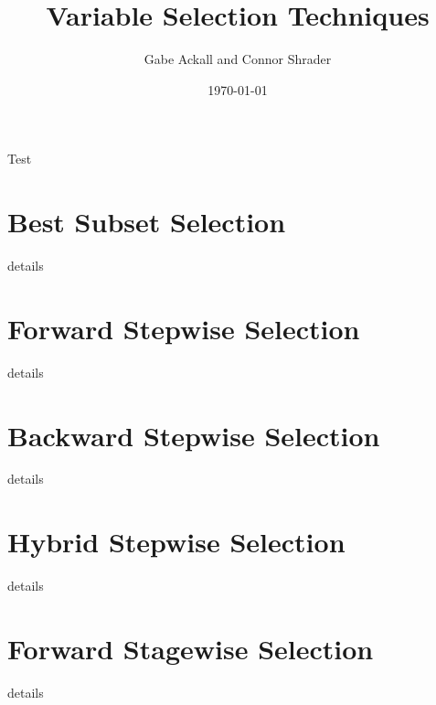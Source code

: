 \documentclass{article}
\title{Variable Selection Techniques}
\author{Gabe Ackall and Connor Shrader}
\date{\today}
\begin{document}
Test

\section{Best Subset Selection}
details

\section{Forward Stepwise Selection}
details

\section{Backward Stepwise Selection}
details

\section{Hybrid Stepwise Selection}
details

\section{Forward Stagewise Selection}
details
\end{document}
